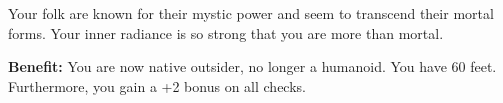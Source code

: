 
Your folk are known for their mystic power and seem to transcend their mortal forms. Your inner radiance is so strong that you are more than mortal.

\textbf{Benefit:} You are now native outsider, no longer a humanoid. You have  60 feet. Furthermore, you gain a +2 bonus on all  checks.